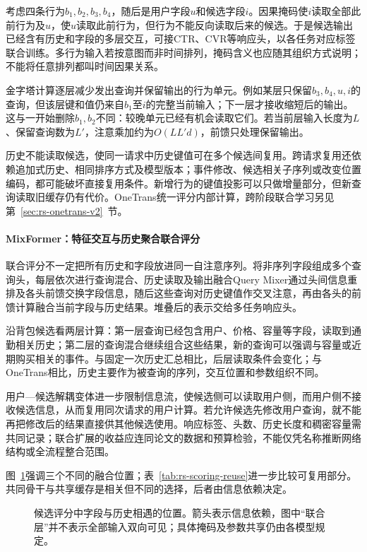 考虑四条行为$b_1,b_2,b_3,b_4$，随后是用户字段$u$和候选字段$i$。因果掩码使$i$读取全部此前行为及$u$，使$u$读取此前行为，但行为不能反向读取后来的候选。于是候选输出已经含有历史和字段的多层交互，可接CTR、CVR等响应头，以各任务对应标签联合训练。多行为输入若按意图而非时间排列，掩码含义也应随其组织方式说明；不能将任意排列都叫时间因果关系。

金字塔计算逐层减少发出查询并保留输出的行为单元。例如某层只保留$b_3,b_4,u,i$的查询，但该层键和值仍来自$b_1$至$i$的完整当前输入；下一层才接收缩短后的输出。这与一开始删除$b_1,b_2$不同：较晚单元已经有机会读取它们。若当前层输入长度为$L$、保留查询数为$L'$，注意乘加约为$O(LL'd)$，前馈只处理保留输出。

历史不能读取候选，使同一请求中历史键值可在多个候选间复用。跨请求复用还依赖追加式历史、相同排序方式及模型版本；事件修改、候选相关子序列或改变位置编码，都可能破坏直接复用条件。新增行为的键值投影可以只做增量部分，但新查询读取旧缓存仍有代价。OneTrans统一评分内部计算，跨阶段联合学习另见第~\ref{sec:rs-onetrans-v2}~节。

\Needspace{95mm}
\paragraph{MixFormer：特征交互与历史聚合联合评分}
\label{sec:rs-mixformer}

联合评分不一定把所有历史和字段放进同一自注意序列。将非序列字段组成多个查询头，每层依次进行查询混合、历史读取及输出融合Query Mixer通过头间信息重排及各头前馈交换字段信息，随后这些查询对历史键值作交叉注意，再由各头的前馈计算融合当前字段与历史结果。堆叠后的表示交给多任务响应头。

沿背包候选看两层计算：第一层查询已经包含用户、价格、容量等字段，读取到通勤相关历史；第二层的查询混合继续组合这些结果，新的查询可以强调与容量或近期购买相关的事件。与固定一次历史汇总相比，后层读取条件会变化；与OneTrans相比，历史主要作为被查询的序列，交互位置和参数组织不同。

用户—候选解耦变体进一步限制信息流，使候选侧可以读取用户侧，而用户侧不接收候选信息，从而复用同次请求的用户计算。若允许候选先修改用户查询，就不能再把修改后的结果直接供其他候选使用。响应标签、头数、历史长度和稠密容量需共同记录；联合扩展的收益应连同论文的数据和预算检验，不能仅凭名称推断网络结构或全流程整合范围。

图~\ref{fig:rs-scoring-organization}强调三个不同的融合位置；表~\ref{tab:rs-scoring-reuse}进一步比较可复用部分。共同骨干与共享缓存是相关但不同的选择，后者由信息依赖决定。
\begin{figure}[htbp]
 \centering
 
 \caption{候选评分中字段与历史相遇的位置。箭头表示信息依赖，图中“联合层”并不表示全部输入双向可见；具体掩码及参数共享仍由各模型规定。}
 \label{fig:rs-scoring-organization}
\end{figure}

